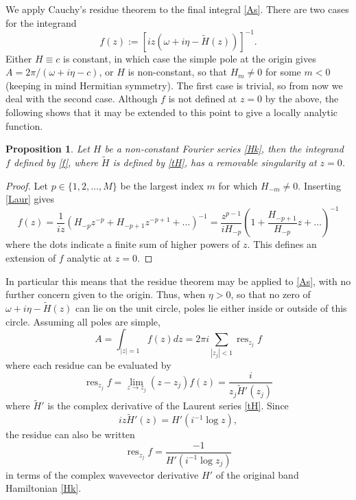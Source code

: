 \documentclass[11pt]{article}
\newcommand{\be}{\begin{equation}}
\newcommand{\ee}{\end{equation}}
\DeclareMathOperator{\res}{res}
\newtheorem{pro}[thm]{Proposition}
\newcommand{\om}{\omega}
\newcommand{\tH}{\tilde H}
\begin{document}
We apply Cauchy's residue theorem to the final integral \eqref{As}.
There are two cases for
the integrand
\be
f(z) := [iz(\om+ i\eta - \tH(z))]^{-1}.
\label{f}
\ee
Either $H\equiv c$ is constant, in which case the simple pole at the
origin gives
$A = 2\pi / (\om+i\eta-c)$, or $H$ is non-constant, so that
$H_m\neq 0$ for some $m<0$ (keeping in mind Hermitian symmetry).
The first case is trivial, so from now we deal with the second case.
Although $f$ is not defined at $z=0$ by the above, the following shows that
it may be extended to this point to give a locally analytic function.
\begin{pro}  %
  \label{p:originok}
  Let $H$ be a non-constant Fourier series \eqref{Hk}, then
  the integrand $f$ defined by \eqref{f}, where $\tH$ is defined by
  \eqref{tH}, has a removable singularity at $z=0$.
\end{pro}   %
\begin{proof}
  Let $p \in \{1,2, \dots, M\}$
  be the largest index $m$ for which $H_{-m} \neq 0$.
  Inserting \eqref{Laur} gives
  $$
  f(z) = \frac{1}{iz}\left( H_{-p}z^{-p} + H_{-p+1}z^{-p+1} + \dots \right)^{-1}
  =
  \frac{z^{p-1}}{iH_{-p}}\left( 1 + \frac{H_{-p+1}}{H_{-p}}z + \dots \right)^{-1}
  $$
  where the dots indicate a finite sum of higher powers of $z$.
  This defines an extension of $f$ analytic at $z=0$.
\end{proof}
In particular this means that the residue theorem may be applied to
\eqref{As}, with no further concern given to the origin.
Thus, when $\eta>0$, so that no zero of $\om + i\eta - \tH(z)$ can lie
on the unit circle, poles lie either inside or outside of this circle.
Assuming all poles are simple,
\be
A = \int_{|z|=1} f(z) dz = 2\pi i \sum_{|z_j|<1} \res_{z_j} f
\ee
where each residue can be evaluated by
\be
\res_{z_j} f = \lim_{z\to z_j} (z-z_j)f(z) = \frac{i}{z_j \tH'(z_j)}
\label{res}
\ee
where $\tH'$ is the complex derivative of the Laurent series \eqref{tH}.
Since
\be
iz\tH'(z) = H'(i^{-1}\log z),
\label{deriv}
\ee
the residue can
also be written
\be
\res_{z_j} f  = \frac{-1}{H'(i^{-1}\log z_j)}
\ee
in terms of the complex wavevector derivative $H'$ of the original band
Hamiltonian \eqref{Hk}.
\end{document}
